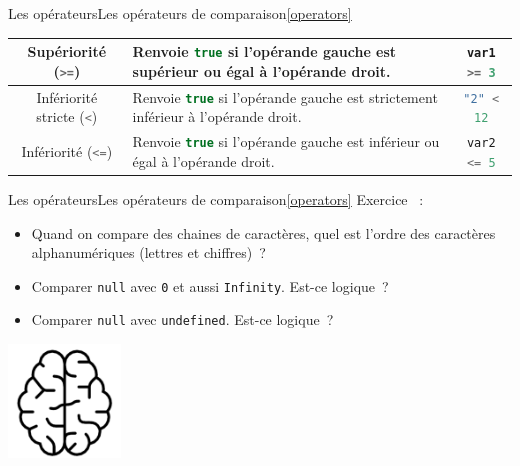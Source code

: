 \documentclass{beamer}
\begin{document}
\begin{frame}[fragile]{Les opérateurs}{Les opérateurs de comparaison\cref{operators}}
\begin{tiny}
\begin{table}[h!]
\begin{tabular}{|c|p{4cm}|c|}
                    \hline
                    Supériorité (\lstinline[language=Javascript]!>=!)        & Renvoie \lstinline[language=Javascript]!true! si l'opérande gauche est supérieur ou égal à l'opérande droit.                                                                       & \lstinline[language=Javascript]!var1 >= 3!                         \\
                    \hline
                    Infériorité stricte (\lstinline[language=Javascript]!<!) & Renvoie \lstinline[language=Javascript]!true! si l'opérande gauche est strictement inférieur à l'opérande droit.                                                                   & \lstinline[language=Javascript]!"2" < 12!                          \\
                    \hline
                    Infériorité (\lstinline[language=Javascript]!<=!)        & Renvoie \lstinline[language=Javascript]!true! si l'opérande gauche est inférieur ou égal à l'opérande droit.                                                                       & \lstinline[language=Javascript]!var2 <= 5!                         \\
                    \hline
                \end{tabular}
            \end{table}
        \end{tiny}
    \end{frame}

    \begin{frame}{Les opérateurs}{Les opérateurs de comparaison\cref{operators}}
        Exercice \execcounterdispinc{}~:
        \begin{itemize}
            \item Quand on compare des chaines de caractères, quel est l'ordre des caractères
            alphanumériques (lettres et chiffres)~?
            \item Comparer \lstinline{null} avec \lstinline{0} et aussi \lstinline{Infinity}.
            Est-ce logique~?
            \item Comparer \lstinline{null} avec \lstinline{undefined}.
            Est-ce logique~?
        \end{itemize}
        \bigbreak
        \centering
        \includegraphics[width=3cm]{image/intelligence}
    \end{frame}
\end{document}
